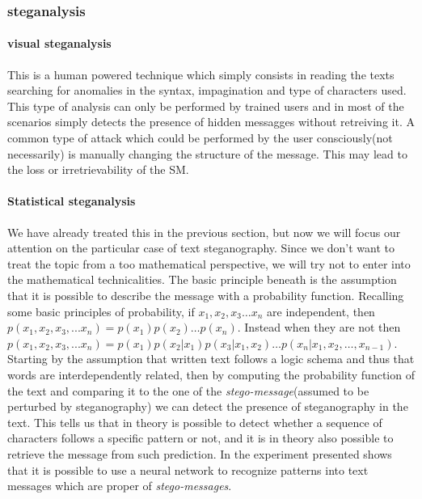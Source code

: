 \documentclass[../../main.tex]{subfiles}
\begin{document}
    \subsubsection{steganalysis}

    \paragraph{visual steganalysis}
    This is a human powered technique which simply consists in reading the texts
    searching for anomalies in the syntax, impagination and type of characters
    used.
    This type of analysis can only be performed by trained users and in most of
    the scenarios simply detects the presence of hidden messagges without
    retreiving it.
    A common type of attack which could be performed by the user consciously(not
    necessarily) is manually changing the structure of the message.
    This may lead to the loss or irretrievability of the SM.

    \paragraph{Statistical steganalysis}
    We have already treated this in the previous section, but now we will focus
    our attention on the particular case of text steganography.
    Since we don't want to treat the topic from a too mathematical perspective,
    we will try not to enter into the mathematical technicalities.
    The basic principle beneath is the assumption that it is possible to
    describe the message with a probability function.
    Recalling some basic principles of probability, if
    $ x_1, x_2, x_3 \dots x_n $ are independent, then
    $ p(x_1, x_2, x_3, ... x_n) = p(x_1) p(x_2) \dots p(x_n)$. 
    Instead when they are not then
    $ p(x_1, x_2, x_3, ... x_n) = p(x_1) p(x_2 | x_1) p(x_3 | x_1, x_2) \dots
    p(x_n | x_1, x_2, \dots, x_{n-1})$.
    Starting by the assumption that written text follows a logic schema and thus
    that words are interdependently related, then by computing the probability
    function of the text and comparing it to the one of the
    \emph{stego-message}(assumed to be perturbed by steganography) we can detect
    the presence of steganography in the text. 
    This tells us that in theory is possible to detect whether a sequence of
    characters follows a specific pattern or not, and it is in theory also
    possible to retrieve the message from such prediction.
    In \cite{fast-steg-method} the experiment presented shows that it is
    possible to use a neural network to recognize patterns into text messages
    which are proper of \emph{stego-messages}.
\end{document}
